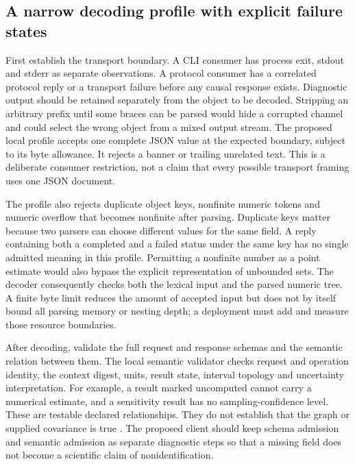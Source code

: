 \subsection{A narrow decoding profile with explicit failure states}

First establish the transport boundary. A CLI consumer has process exit,
stdout and stderr as separate observations. A protocol consumer has a
correlated protocol reply or a transport failure before any causal response
exists. Diagnostic output should be retained separately from the object to
be decoded. Stripping an arbitrary prefix until some braces can be parsed
would hide a corrupted channel and could select the wrong object from a
mixed output stream. The proposed local profile accepts one complete JSON
value at the expected boundary, subject to its byte allowance. It rejects a
banner or trailing unrelated text. This is a deliberate consumer restriction,
not a claim that every possible transport framing uses one JSON document.

The profile also rejects duplicate object keys, nonfinite numeric tokens and
numeric overflow that becomes nonfinite after parsing. Duplicate keys matter
because two parsers can choose different values for the same field. A reply
containing both a completed and a failed status under the same key has no
single admitted meaning in this profile. Permitting a nonfinite number as a
point estimate would also bypass the explicit representation of unbounded
sets. The decoder consequently checks both the lexical input and the parsed
numeric tree. A finite byte limit reduces the amount of accepted input but
does not by itself bound all parsing memory or nesting depth; a deployment
must add and measure those resource boundaries.

After decoding, validate the full request and response schemas and the
semantic relation between them. The local semantic validator checks request
and operation identity, the context digest, units, result state, interval
topology and uncertainty interpretation. For example, a result marked
uncomputed cannot carry a numerical estimate, and a sensitivity result has
no sampling-confidence level. These are testable declared relationships.
They do not establish that the graph or supplied covariance is true
\citep{exec13_i2_examples}. The proposed client should keep schema admission
and semantic admission as separate diagnostic steps so that a missing field
does not become a scientific claim of nonidentification.

